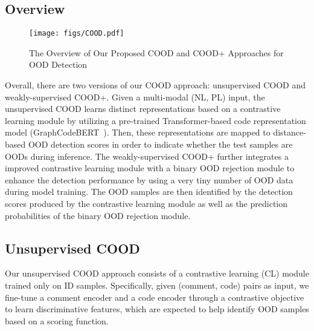 \subsection{Overview}
\begin{figure*}[!thb]
\begin{center}
 \texttt{[image: figs/COOD.pdf]}
    \caption{The Overview of Our Proposed COOD and COOD+ Approaches for OOD Detection %
    }
    \label{fig:cad}
\end{center}

\end{figure*}

Overall, there are two versions of our COOD approach: unsupervised COOD and weakly-supervised COOD+. Given a multi-modal (NL, PL) input, the unsupervised COOD learns distinct representations based on a contrastive learning module by utilizing a pre-trained Transformer-based code representation model (\ie GraphCodeBERT~\cite{guo2020graphcodebert}). Then, these representations are mapped to distance-based OOD detection scores in order to indicate whether the test samples are OODs during inference. The weakly-supervised COOD+ further integrates a improved contrastive learning module with a binary OOD rejection module to enhance the detection performance by using a very tiny number of OOD data during model training. The OOD samples are then identified by the detection scores produced by the contrastive learning module as well as the prediction probabilities of the binary OOD rejection module. 

\subsection{Unsupervised COOD}

Our unsupervised COOD approach consists of a contrastive learning (CL) module trained only on ID samples. Specifically, given (comment, code) pairs as input, we fine-tune a comment encoder and a code encoder through a contrastive objective to learn discriminative features, which are expected to help identify OOD samples based on a scoring function. 

